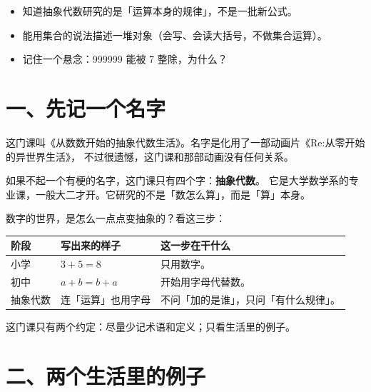 

\begin{mubiao}
  \begin{itemize}
    \item 知道抽象代数研究的是「运算本身的规律」，不是一批新公式。
    \item 能用集合的说法描述一堆对象（会写、会读大括号，不做集合运算）。
    \item 记住一个悬念：999999 能被 7 整除，为什么？
  \end{itemize}
\end{mubiao}

\section*{一、先记一个名字}

这门课叫《从数数开始的抽象代数生活》。名字是化用了一部动画片《Re:从零开始的异世界生活》，
不过很遗憾，这门课和那部动画没有任何关系。

如果不起一个有梗的名字，这门课只有四个字：\textbf{抽象代数}。
它是大学数学系的专业课，一般大二才开。它研究的不是「数怎么算」，而是「算」本身。

数字的世界，是怎么一点点变抽象的？看这三步：

\begin{center}
\begin{tabular}{@{}>{\raggedright\arraybackslash}p{2.4cm}>{\raggedright\arraybackslash}p{4.6cm}>{\raggedright\arraybackslash}p{8.4cm}@{}}
\toprule
\textbf{阶段} & \textbf{写出来的样子} & \textbf{这一步在干什么} \\
\midrule
小学 & \(3+5=8\) & 只用数字。 \\
初中 & \(a+b=b+a\) & 开始用字母代替数。 \\
抽象代数 & 连「运算」也用字母 & 不问「加的是谁」，只问「有什么规律」。 \\
\bottomrule
\end{tabular}
\end{center}

\noindent 这门课只有两个约定：尽量少记术语和定义；只看生活里的例子。

\section*{二、两个生活里的例子}

